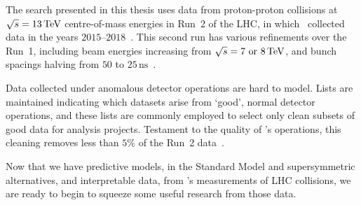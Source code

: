 The search presented in this thesis uses data from proton-proton collisions at
$\sqrt{s} = 13\,\eV[T]$ centre-of-mass energies in Run~2 of the
LHC, in which \atlas\ collected data in the years
$2015\textrm{--}2018$~\cite{atlas2022searches}.
This second run has various refinements over the Run~1, including beam energies
increasing from $\sqrt{s} = 7\textrm{ or }8\,\eV[T]$, and bunch spacings
halving from $50$ to $25\,\textrm{ns}$~\cite{lhc2006run2}.

Data collected under anomalous detector operations are hard to model.
Lists are maintained indicating which datasets arise from `good', normal
detector operations, and these lists are commonly employed to select only clean
subsets of good data for analysis projects.
Testament to the quality of \atlas's operations, this cleaning removes less
than $5\%$ of the Run~2 data~\cite{
DAPR-2018-01,
Golling:2011zy
}.

Now that we have predictive models, in the Standard Model and supersymmetric
alternatives,
and interpretable data, from \atlas's measurements of LHC collisions,
we are ready to begin to squeeze some useful research from those data.

